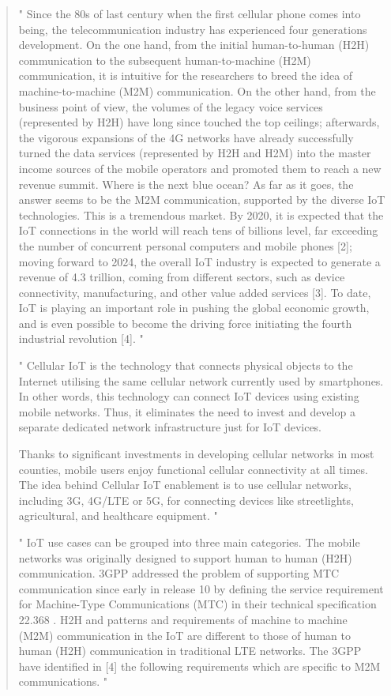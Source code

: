 \documentclass[conference]{IEEEtran}
\begin{document}
\begin{quote}


    "
    Since the 80s of last century when the first cellular phone comes into being, the telecommunication industry has experienced four generations development.
    On the one hand, from the initial human-to-human (H2H) communication to the subsequent human-to-machine (H2M) communication, it is intuitive for the researchers to breed the idea of machine-to-machine (M2M) communication. On the other hand, from the business point of view, the volumes of the legacy voice services (represented by H2H) have long since touched the top ceilings; afterwards, the vigorous expansions of the 4G networks have already successfully turned the data services (represented by H2H and H2M) into the master income sources of the mobile operators and promoted them to reach a new revenue summit. Where is the next blue ocean? As far as it goes, the answer seems to
    be the M2M communication, supported by the diverse IoT technologies. This is a tremendous market. By 2020, it is expected that the IoT connections in the world will reach tens of billions level, far exceeding the number of concurrent personal computers and mobile phones [2]; moving forward to 2024, the overall IoT industry is expected to generate a revenue of 4.3 trillion, coming from different sectors, such as device connectivity, manufacturing, and other value added services [3]. To date, IoT is playing an important role in pushing the global economic growth, and is even possible to become the driving force initiating the fourth industrial revolution [4].
    "
    
    
    "
    Cellular IoT is the technology that connects physical objects to the Internet utilising the same cellular network currently used by smartphones. In other words, this technology can connect IoT devices using existing mobile networks. Thus, it eliminates the need to invest and develop a separate dedicated network infrastructure just for IoT devices.
    
    Thanks to significant investments in developing cellular networks in most counties, mobile users enjoy functional cellular connectivity at all times. The idea behind Cellular IoT enablement is to use cellular networks, including 3G, 4G/LTE or 5G, for connecting devices like streetlights, agricultural, and healthcare equipment.
    "

    "
    IoT use cases can be grouped into three main categories. The mobile networks was originally designed to support human to human (H2H) communication. 3GPP addressed the problem of supporting MTC communication since early in release 10 by defining the service requirement for Machine-Type Communications (MTC) in their technical specification 22.368 \cite{3gpp.22.368} . H2H and patterns and requirements of machine to machine (M2M) communication in the IoT are different to those of human to human (H2H) communication in traditional LTE networks. The 3GPP have identiﬁed in [4] the following requirements which are speciﬁc to M2M communications.
    "
\end{quote}
\end{document}
